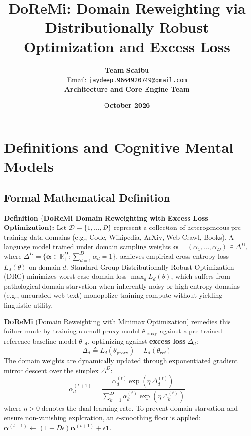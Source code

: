 \documentclass[11pt,a4paper]{article}
\title{\textbf{DoReMi: Domain Reweighting via Distributionally Robust Optimization and Excess Loss}}
\author{\textbf{Team Scaibu} \\ \small Email: \texttt{jaydeep.9664920749@gmail.com} \\ \small \textbf{Architecture and Core Engine Team}}
\date{\textbf{October 2026}}
\theoremstyle{definition}
\begin{document}
\maketitle

\section{Definitions and Cognitive Mental Models}

\subsection{Formal Mathematical Definition}
\textbf{Definition (DoReMi Domain Reweighting with Excess Loss Optimization):}
Let $\mathcal{D} = \{1, \dots, D\}$ represent a collection of heterogeneous pre-training data domains (e.g., Code, Wikipedia, ArXiv, Web Crawl, Books). A language model trained under domain sampling weights $\boldsymbol{\alpha} = (\alpha_1, \dots, \alpha_D) \in \Delta^D$, where $\Delta^D = \{ \boldsymbol{\alpha} \in \mathbb{R}_+^D : \sum_{d=1}^D \alpha_d = 1 \}$, achieves empirical cross-entropy loss $L_d(\theta)$ on domain $d$. Standard Group Distributionally Robust Optimization (DRO) minimizes worst-case domain loss $\max_d L_d(\theta)$, which suffers from pathological domain starvation when inherently noisy or high-entropy domains (e.g., uncurated web text) monopolize training compute without yielding linguistic utility.

\textbf{DoReMi} (Domain Reweighting with Minimax Optimization) remedies this failure mode by training a small proxy model $\theta_{\text{proxy}}$ against a pre-trained reference baseline model $\theta_{\text{ref}}$, optimizing against \textbf{excess loss} $\Delta_d$:
{\boldmath
\begin{equation}
\Delta_d \triangleq L_d(\theta_{\text{proxy}}) - L_d(\theta_{\text{ref}})
\end{equation}
}
The domain weights are dynamically updated through exponentiated gradient mirror descent over the simplex $\Delta^D$:
{\boldmath
\begin{equation}
\alpha_d^{(t+1)} = \frac{\alpha_d^{(t)} \exp\left( \eta \, \Delta_d^{(t)} \right)}{\sum_{k=1}^D \alpha_k^{(t)} \exp\left( \eta \, \Delta_k^{(t)} \right)}
\end{equation}
}
where $\eta > 0$ denotes the dual learning rate. To prevent domain starvation and ensure non-vanishing exploration, an $\epsilon$-smoothing floor is applied: $\boldsymbol{\alpha}^{(t+1)} \leftarrow (1 - D\epsilon)\boldsymbol{\alpha}^{(t+1)} + \epsilon \mathbf{1}$.
\end{document}
